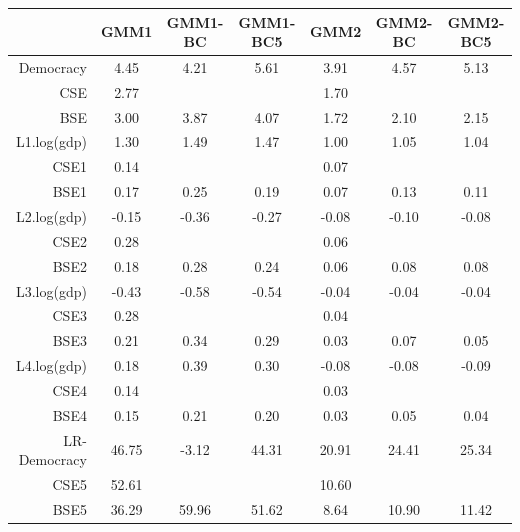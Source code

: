 \begin{table}[ht]
\centering
\begin{tabular}{rcccccc}
  \hline
 & GMM1 & GMM1-BC & GMM1-BC5 & GMM2 & GMM2-BC & GMM2-BC5 \\ 
  \hline
Democracy & 4.45 & 4.21 & 5.61 & 3.91 & 4.57 & 5.13 \\ 
  CSE & 2.77 &  &  & 1.70 &  &  \\ 
  BSE & 3.00 & 3.87 & 4.07 & 1.72 & 2.10 & 2.15 \\ 
  L1.log(gdp) & 1.30 & 1.49 & 1.47 & 1.00 & 1.05 & 1.04 \\ 
  CSE1 & 0.14 &  &  & 0.07 &  &  \\ 
  BSE1 & 0.17 & 0.25 & 0.19 & 0.07 & 0.13 & 0.11 \\ 
  L2.log(gdp) & -0.15 & -0.36 & -0.27 & -0.08 & -0.10 & -0.08 \\ 
  CSE2 & 0.28 &  &  & 0.06 &  &  \\ 
  BSE2 & 0.18 & 0.28 & 0.24 & 0.06 & 0.08 & 0.08 \\ 
  L3.log(gdp) & -0.43 & -0.58 & -0.54 & -0.04 & -0.04 & -0.04 \\ 
  CSE3 & 0.28 &  &  & 0.04 &  &  \\ 
  BSE3 & 0.21 & 0.34 & 0.29 & 0.03 & 0.07 & 0.05 \\ 
  L4.log(gdp) & 0.18 & 0.39 & 0.30 & -0.08 & -0.08 & -0.09 \\ 
  CSE4 & 0.14 &  &  & 0.03 &  &  \\ 
  BSE4 & 0.15 & 0.21 & 0.20 & 0.03 & 0.05 & 0.04 \\ 
  LR-Democracy & 46.75 & -3.12 & 44.31 & 20.91 & 24.41 & 25.34 \\ 
  CSE5 & 52.61 &  &  & 10.60 &  &  \\ 
  BSE5 & 36.29 & 59.96 & 51.62 & 8.64 & 10.90 & 11.42 \\ 
   \hline
\end{tabular}
\end{table}
